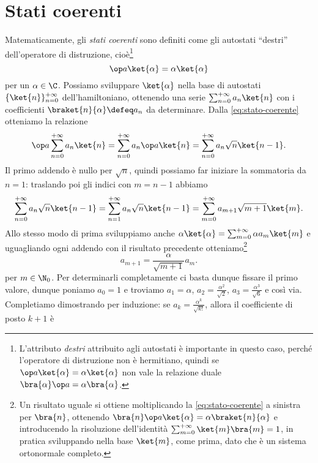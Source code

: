 \section{Stati coerenti}
Matematicamente, gli \emph{stati coerenti} sono definiti come gli autostati ``destri'' dell'operatore di distruzione, cioè\footnote{L'attributo \emph{destri} attribuito agli autostati è importante in questo caso, perch\'e l'operatore di distruzione non è hermitiano, quindi se $\op a\ket{\alpha}=\alpha\ket{\alpha}$ non vale la relazione duale $\bra{\alpha}\op a=\alpha\bra{\alpha}$.}
\begin{equation}
	\op a\ket{\alpha}=\alpha\ket{\alpha}
	\label{eq:stato-coerente}
\end{equation}
per un $\alpha\in\C$.
Possiamo sviluppare $\ket{\alpha}$ nella base di autostati $\{\ket{n}\}_{n=0}^{+\infty}$ dell'hamiltoniano, ottenendo una serie $\sum_{n=0}^{+\infty}a_n\ket{n}$ con i coefficienti $\braket{n}{\alpha}\defeq a_n$ da determinare.
Dalla \eqref{eq:stato-coerente} otteniamo la relazione
\begin{equation}
	\op a\sum_{n=0}^{+\infty}a_n\ket{n}=\sum_{n=0}^{+\infty}a_n\op a\ket{n}=\sum_{n=0}^{+\infty}a_n\sqrt{n}\ket{n-1}.
\end{equation}
Il primo addendo è nullo per $\sqrt{n}$, quindi possiamo far iniziare la sommatoria da $n=1$: traslando poi gli indici con $m=n-1$ abbiamo
\begin{equation}
	\sum_{n=0}^{+\infty}a_n\sqrt{n}\ket{n-1}=\sum_{n=1}^{+\infty}a_n\sqrt{n}\ket{n-1}=\sum_{m=0}^{+\infty}a_{m+1}\sqrt{m+1}\ket{m}.
\end{equation}
Allo stesso modo di prima sviluppiamo anche $\alpha\ket{\alpha}=\sum_{m=0}^{+\infty}\alpha a_m\ket{m}$ e uguagliando ogni addendo con il risultato precedente otteniamo\footnote{Un risultato uguale si ottiene moltiplicando la \eqref{eq:stato-coerente} a sinistra per $\bra{n}$, ottenendo $\bra{n}\op a\ket{\alpha}=\alpha\braket{n}{\alpha}$ e introducendo la risoluzione dell'identità $\sum_{m=0}^{+\infty}\ket{m}\bra{m}=1$, in pratica sviluppando nella base $\ket{m}$, come prima, dato che è un sistema ortonormale completo.}
\begin{equation}
	a_{m+1}=\frac{\alpha}{\sqrt{m+1}}a_m.
	\label{eq:ricorrenza-stati-coerenti}
\end{equation}
per $m\in\N_0$.
Per determinarli completamente ci basta dunque fissare il primo valore, dunque poniamo $a_0=1$ e troviamo $a_1=\alpha$, $a_2=\frac{\alpha^2}{\sqrt{2}}$, $a_3=\frac{\alpha^3}{\sqrt{6}}$ e cos\`i via.
Completiamo dimostrando per induzione: se $a_k=\frac{\alpha^k}{\sqrt{k!}}$, allora il coefficiente di posto $k+1$ è
